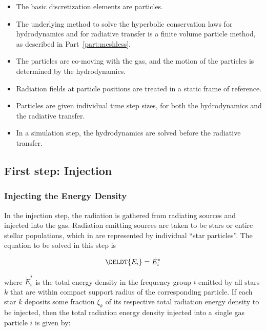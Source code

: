 \begin{itemize}
\item The basic discretization elements are particles.
\item The underlying method to solve the hyperbolic conservation laws for hydrodynamics and for
radiative transfer is a finite volume particle method, as described in Part~\ref{part:meshless}.
\item The particles are co-moving with the gas, and the motion of the particles is determined by
the hydrodynamics.
\item Radiation fields at particle positions are treated in a static frame of reference.
\item Particles are given individual time step sizes, for both the hydrodynamics and the radiative
transfer.
\item In a simulation step, the hydrodynamics are solved before the radiative transfer.
\end{itemize}













\subsection{First step: Injection} \label{chap:injection-step}


\subsubsection{Injecting the Energy Density}


In the injection step, the radiation is gathered from radiating sources and injected into the gas.
Radiation emitting sources are taken to be stars or entire stellar populations, which in \swift are
represented by individual ``star particles''. The equation to be solved in this step is

\begin{equation}
    \DELDT{E_i} = \dot{E}_i^* \label{eq:solve-dEdt}
\end{equation}

where $\dot{E}_i^*$ is the total energy density in the frequency group $i$ emitted by all stars $k$
that are within compact support radius of the corresponding particle. If each star $k$ deposits
some fraction $\xi_k$ of its respective total radiation energy density to be injected,
then the total radiation energy density injected into a single gas particle $i$ is given by:

